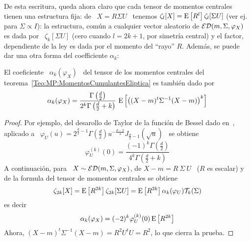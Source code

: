 De  esta escritura,  queda ahora  claro que  cada tensor  de  momentos centrales
tienen  una estructura  fija: de  \ $X  = R  \Sigma U$  \ tenemos  $\zeta_l[X] =
\operatorname{E}\left[  R^l \right]  \zeta_l[\Sigma  U]$ (ver  ej.~\cite[teo.~2.8]{FanKot90}
para $\Sigma \propto I$): la estructura, com\'un a cualquier vector aleatorio de
$\mathcal{ED}(m,\Sigma,\varphi_X)$ es dada por \  $\zeta_k[\Sigma U]$ (cero cuando $l = 2
k + 1$, por  simetr\'ia central) y el factor, dependiente de  la ley es dada por
el  momento  del ``rayo''  $R$.   Adem\'as,  se puede  dar  una  otra forma  del
coefficiente $\alpha_k$:
%
\begin{lema}\label{Lem:MP:AlphaConR}
  El coeficiente \ $\alpha_k(\varphi_X)$ \  del tensor de los momentos centrales
  del teorema~\ref{Teo:MP:MomentosCumulantesEliptica} es tambi\'en dado por
  \[
  \alpha_k(\varphi_X) = \frac{\Gamma\left( \frac{d}{2} \right)}{2^k \Gamma\left(
      \frac{d}{2}  + k\right)}  \, \operatorname{E}\left[  \left( (X-m)^t  \Sigma^{-1} (X-m)
    \right)^k \right]
  \]
\end{lema}
%
\begin{proof}
  Por  ejemplo,  del  desarollo  de  Taylor  de  la  funci\'on  de  Bessel  dado
  en~\cite{GraRyz15},   aplicado   a   \   $\varphi_U(u)   =   2^{\frac{d}{2}-1}
  \Gamma\left(  \frac{d}{2} \right) u^{-\frac{d-2}{4}}  J_{\frac{d}{2}-1} \left(
    \sqrt{u} \right)$ \ se obtiene
  \[
  \varphi_U^{(k)}(0)   =  \frac{(-1)^k   \Gamma\left(   \frac{d}{2}  \right)}{4^k
  \Gamma\left( \frac{d}{2} + k\right)}
  \]
  A  continuaci\'on, para  \ $X  \sim \mathcal{ED}(m,\Sigma,\varphi_X)$,  de $X-m  =  R \
  \Sigma  \ U$  \  ($R$ es  escalar)  y de  la formula  del  tensor de  momentos
  centrales se obtiene
  \[
  \zeta_{2    k}[X]     =    \operatorname{E}\left[    R^{2     k}    \right]
  \zeta_{2   k}[\Sigma   U]   =   \operatorname{E}\left[  R^{2   k}   \right]
  \alpha_k(\varphi_U) \mathcal{T}_k(\Sigma)
  \]
  es decir
  \[
  \alpha_k(\varphi_X) = (-2)^k \varphi_U^{(k)}(0) \operatorname{E}\left[ R^{2 k} \right]
  \]
  Ahora, $(X-m)^t \Sigma^{-1} (X-m) = R^2 U^t U = R^2$, lo que cierra la prueba.
\end{proof}

